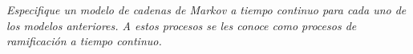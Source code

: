 \emph{
    Especifique un modelo de cadenas de Markov a tiempo continuo para cada uno de los
    modelos anteriores. A estos procesos se les conoce como procesos de ramificaci\'on
    a tiempo continuo.\pn
}
\afterstatement\pn
